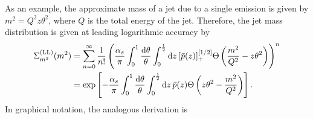 As an example, the approximate mass of a jet due to a single emission is given by \(m^2 = Q^2 z\theta^2\), where \(Q\) is the total energy of the jet.
%
Therefore, the jet mass distribution is given at leading logarithmic accuracy by
%
\begin{equation}
\begin{aligned}
    \Sigma^{\rm(LL)}_{m^2}(m^2)
    &=
    \sum_{n = 0}^{\infty}\frac{1}{n!}
    \left(
    \frac{\alpha_s}{\pi}
    \int_0^1 \frac{\dd\theta}{\theta}
    \int_0^{\frac{1}{2}} \dd z\,[\bar{p}(z)]_+^{[1/2]}
    \Theta\left(
    \frac{m^2}{Q^2} - z\theta^2
    \right)
    \right)^n
    \\
    &=
    \exp\left[
    -\frac{\alpha_s}{\pi}
    \int_0^1 \frac{\dd\theta}{\theta}
    \int_0^{\frac{1}{2}} \dd z\,\bar{p}(z)
    \Theta\left(
    z \theta^2 - \frac{m^2}{Q^2}
    \right)
    \right]
    .
\end{aligned}
\end{equation}
In graphical notation, the analogous derivation is
